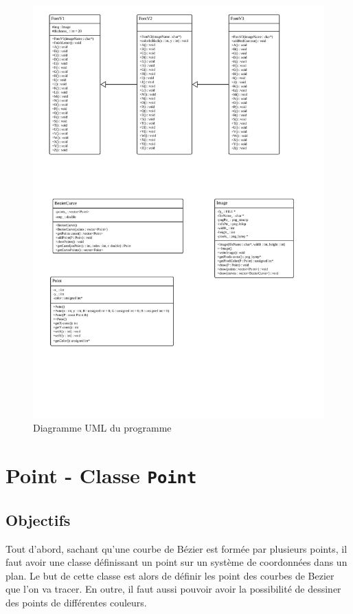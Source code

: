 \documentclass[a4paper, 12pt]{article}
\begin{document}
\begin{figure}[h]
\centering
\includegraphics[scale=0.2]{Images/DiagramUML.jpg}
\caption{Diagramme UML du programme}
\label{fig1}
\end{figure}

\newpage
\section{Point - Classe \texttt{Point}}	
\subsection{Objectifs}
	Tout d'abord, sachant qu'une courbe de Bézier est formée par plusieurs points, il faut avoir une classe définissant un point sur un système de coordonnées dans un plan. Le but de cette classe est alors de définir les point des courbes de Bezier que l'on va tracer. En outre, il faut aussi pouvoir avoir la possibilité de dessiner des points de différentes couleurs.
	
\end{document}

